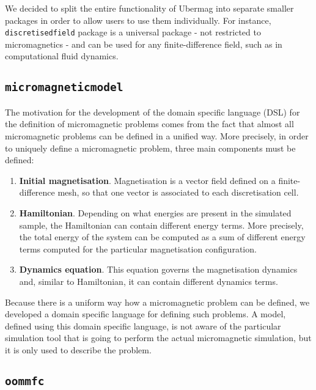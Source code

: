 \documentclass{deliverablereport}
\begin{document}
We decided to split the entire functionality of Ubermag into separate
smaller packages in order to allow users to use them individually. For
instance, \texttt{discretisedfield} package is a universal package -
not restricted to micromagnetics - and can be used for any
finite-difference field, such as in computational fluid dynamics.

\subsection{\texttt{micromagneticmodel}}\label{sec:micromagneticmodel}

The motivation for the development of the domain specific language
(DSL) for the definition of micromagnetic problems comes from the fact
that almost all micromagnetic problems can be defined in a unified
way. More precisely, in order to uniquely define a micromagnetic
problem, three main components must be defined:


\begin{enumerate}
\item \textbf{Initial magnetisation}. Magnetisation is a vector
field defined on a finite-difference mesh, so that one vector is
associated to each discretisation cell.
\item \textbf{Hamiltonian}. Depending on what energies are present in
the simulated sample, the Hamiltonian can contain different energy
terms. More precisely, the total energy of the system can be computed
as a sum of different energy terms computed for the particular
magnetisation configuration.
\item \textbf{Dynamics equation}. This equation governs the
magnetisation dynamics and, similar to Hamiltonian, it can contain
different dynamics terms.
\end{enumerate}

Because there is a uniform way how a micromagnetic problem can be
defined, we developed a domain specific language for defining such
problems. A model, defined using this domain specific language, is not
aware of the particular simulation tool that is going to perform the
actual micromagnetic simulation, but it is only used to describe the
problem.

\subsection{\texttt{oommfc}}\label{sec:oommfc}
\end{document}
